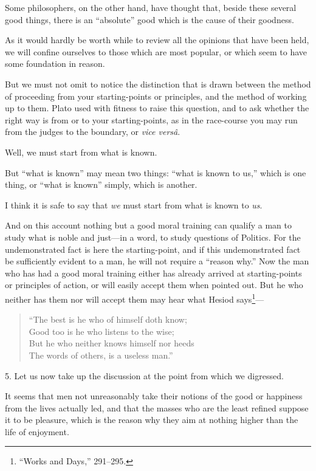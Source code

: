 Some philosophers, on the other hand, have thought that, beside these
several good things, there is an ``absolute'' good which is the cause
of their goodness.

As it would hardly be worth while to review all the opinions that have
been held, we will confine ourselves to those which are most popular,
or which seem to have some foundation in reason.

But we must not omit to notice the distinction that is drawn
between the method of proceeding from your starting-points or
principles, and the method of working up to them. Plato used with
fitness to raise this question, and to ask whether the right way is
from or to your starting-points, as in the race-course you may run
from the judges to the boundary, or \textit{vice vers\^a}.

Well, we must start from what is known.

But ``what is known'' may mean two things: ``what is known to us,''
which is one thing, or ``what is known'' simply, which is another.

I think it is safe to say that \textit{we} must start from what is
known to \textit{us}.

And on this account nothing but a good moral training can qualify a
man to study what is noble and just---in a word, to study questions of
Politics. For the undemonstrated fact is here the starting-point, and
if this undemonstrated fact be sufficiently evident to a man, he will
not require a ``reason why.'' Now the man who has had a good moral
training either has already arrived at starting-points or principles
of action, or will easily accept them when pointed out. But he who
neither has them nor will accept them may hear what Hesiod
says\footnote{``Works and Days,'' 291--295.}---

\begin{verse}
``The best is he who of himself doth know;\\
Good too is he who listens to the wise;\\
But he who neither knows himself nor heeds\\
The words of others, is a useless man.''
\end{verse}

5. Let us now take up the discussion at the point from which we
digressed.

It seems that men not unreasonably take their notions of the
good or happiness from the lives actually led, and that the masses who
are the least refined suppose it to be pleasure, which is the reason
why they aim at nothing higher than the life of enjoyment.

